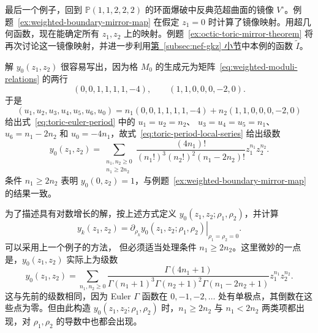 \begin{example}\label{ex:weighted-hypergeometric-mirror-map}
最后一个例子，回到 $\mathbb P(1,1,2,2,2)$ 的环面爆破中反典范超曲面的镜像 $V^\circ$。例题~\ref{ex:weighted-boundary-mirror-map} 在假定 $z_1=0$ 时计算了镜像映射。用超几何函数，现在能确定所有 $z_1,z_2$ 上的映射。例题~\ref{ex:octic-toric-mirror-theorem} 将再次讨论这一镜像映射，并进一步利用\hyperref[subsec:nef-gkz]{第~\ref*{subsec:nef-gkz} 小节}中本例的函数 $\widetilde I$。

解 $y_0(z_1,z_2)$ 很容易写出，因为格 $M_0$ 的生成元为矩阵~\eqref{eq:weighted-moduli-relations} 的两行
\[
(0,0,1,1,1,1,-4),\qquad(1,1,0,0,0,-2,0).
\]
于是
\[
(u_1,u_2,u_3,u_4,u_5,u_6,u_0)
=n_1(0,0,1,1,1,1,-4)+n_2(1,1,0,0,0,-2,0)
\]
给出式~\eqref{eq:toric-euler-period} 中的 $u_1=u_2=n_2$、
$u_3=u_4=u_5=n_1$、$u_6=n_1-2n_2$ 和 $u_0=-4n_1$，故式~\eqref{eq:toric-period-local-series} 给出级数
\[
y_0(z_1,z_2)=
\sum_{\substack{n_1,n_2\geq0\\n_1\geq2n_2}}
\frac{(4n_1)!}{(n_1!)^3(n_2!)^2(n_1-2n_2)!}z_1^{n_1}z_2^{n_2}.
\]
条件 $n_1\geq2n_2$ 表明 $y_0(0,z_2)=1$，与例题~\ref{ex:weighted-boundary-mirror-map} 的结果一致。

为了描述具有对数增长的解，按上述方式定义 $y_0(z_1,z_2;\rho_1,\rho_2)$，并计算
\[
y_k(z_1,z_2)=\left.\partial_{\rho_k}y_0(z_1,z_2;\rho_1,\rho_2)\right|_{\rho_1=\rho_2=0}.
\]
可以采用上一个例子的方法，
但必须适当处理条件 $n_1\geq2n_2$。这里微妙的一点是，$y_0(z_1,z_2)$ 实际上为级数
\[
y_0(z_1,z_2)=\sum_{n_1,n_2\geq0}
\frac{\Gamma(4n_1+1)}
{\Gamma(n_1+1)^3\Gamma(n_2+1)^2\Gamma(n_1-2n_2+1)}
z_1^{n_1}z_2^{n_2}.
\]
这与先前的级数相同，因为 Euler $\Gamma$ 函数在 $0,-1,-2,\ldots$ 处有单极点，其倒数在这些点为零。但由此构造 $y_0(z_1,z_2;\rho_1,\rho_2)$ 时，$n_1\geq2n_2$ 与 $n_1<2n_2$ 两类项都出现，对 $\rho_1,\rho_2$ 的导数中也都会出现。


\end{example}
